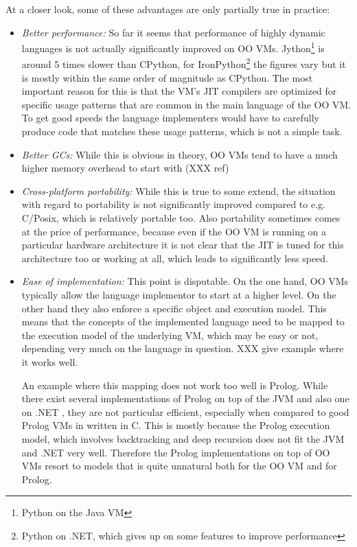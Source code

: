 \documentclass{llncs}
\begin{document}
At a closer look, some of these advantages are only partially true in practice:

\begin{itemize}
\item
\emph{Better performance:} So far it seems that performance of highly dynamic
languages is not actually significantly improved on OO VMs. 
Jython\footnote{Python on the Java VM} is around 5
times slower than CPython, for IronPython\footnote{Python on .NET, which
gives up on some features to improve performance}
the figures vary but it is mostly
within the same order of magnitude as CPython. The most important reason for
this is that the VM's JIT compilers are optimized for specific usage patterns
that are common in the main language of the OO VM. To get good speeds the
language implementers would have to carefully produce code that matches these
usage patterns, which is not a simple task.

\item
\emph{Better GCs:} While this is obvious in theory, OO VMs tend to have a much
higher memory overhead to start with (XXX ref)

\item
\emph{Cross-platform portability:} While this is true to some extend, the
situation with regard to portability is not significantly improved compared to
e.g.  C/Posix, which is relatively portable too. Also portability sometimes
comes at the price of performance, because even if the OO VM is running on a
particular hardware architecture it is not clear that the JIT is tuned for this
architecture too or working at all, which leads to significantly less
speed.

\item
\emph{Ease of implementation:} This point is disputable. On the one hand, OO
VMs typically allow the language implementor to start at a higher level. On the
other hand they also enforce a specific object and execution model. This means
that the concepts of the implemented language need to be mapped to the
execution model of the underlying VM, which may be easy or not, depending very
much on the language in question. XXX give example where it works well.

An example where this mapping does not work too well is Prolog. While there
exist several implementations of Prolog on top of the JVM \cite{prologcafe}
\cite{InterProlog} and also one on .NET \cite{psharp},
they are not particular efficient, especially when compared to good Prolog VMs
in written in C. This is mostly because the Prolog execution model, which
involves backtracking and deep recursion does not fit the JVM and .NET very
well. Therefore the Prolog implementations on top of OO VMs resort to models
that is quite unnatural both for the OO VM and for Prolog.
\end{itemize}
\end{document}
